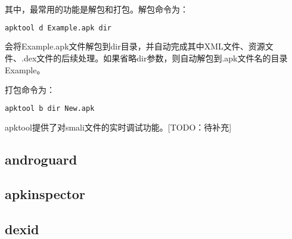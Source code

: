 其中，最常用的功能是解包和打包。解包命令为：
\begin{lstlisting}[language=bash, numbers=none]
apktool d Example.apk dir
\end{lstlisting}
会将Example.apk文件解包到dir目录，并自动完成其中XML文件、资源文件、.dex文件的后续处理。如果省略dir参数，则自动解包到.apk文件名的目录Example。

打包命令为：
\begin{lstlisting}[language=bash, numbers=none]
apktool b dir New.apk
\end{lstlisting}

apktool提供了对smali文件的实时调试功能。[TODO：待补充]
\subsection{androguard}
\subsection{apkinspector}
\subsection{dexid}
